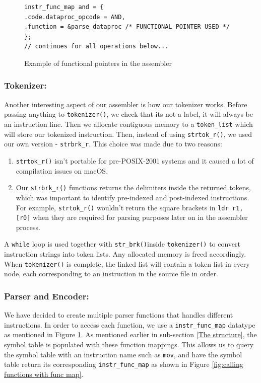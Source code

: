 \documentclass[a4paper]{article}
\begin{document}
\begin{figure}[htp]
\centering
\begin{BVerbatim}
instr_func_map and = {
.code.dataproc_opcode = AND,
.function = &parse_dataproc /* FUNCTIONAL POINTER USED */
};
// continues for all operations below...
\end{BVerbatim}
\caption{Example of functional pointers in the assembler}
\label{fig:functional_pointers}
\end{figure}

\subsubsection{Tokenizer:}
Another interesting aspect of our assembler is how our tokenizer works. Before passing anything to \verb|tokenizer()|, we check that its not a label, it will always be an instruction line. Then we allocate contiguous memory to a \verb|token_list| which will store our tokenized instruction. Then, instead of using \verb|strtok_r()|, we used our own version - \verb|strbrk_r|. This choice was made due to two reasons:
\begin{enumerate}
    \item \verb|strtok_r()| isn't portable for pre-POSIX-2001 systems and it caused a lot of compilation issues on macOS.
    \item Our \verb|strbrk_r()| functions returns the delimiters inside the returned tokens, which was important to identify pre-indexed and post-indexed instructions. For example, \verb|strtok_r()| wouldn't return the square brackets in \verb|ldr r1, [r0]| when they are required for parsing purposes later on in the assembler process.
\end{enumerate}
A \verb|while| loop is used together with \verb|str_brk()|inside \verb|tokenizer()| to convert instruction strings into token lists. Any allocated memory is freed accordingly. When \verb|tokenizer()| is complete, the linked list will contain a token list in every node, each corresponding to an instruction in the source file in order.

\subsubsection{Parser and Encoder:}
We have decided to create multiple parser functions that handles different instructions. In order to access each function, we use a \verb|instr_func_map| datatype as mentioned in Figure \ref{fig:functional_pointers}. As mentioned earlier in sub-section \ref{The structure}, the symbol table is populated with these function mappings. This allows us to query the symbol table with an instruction name such as \verb|mov|, and have the symbol table return its corresponding \verb|instr_func_map| as shown in Figure \ref{fig:calling functions with func map}.
\end{document}

